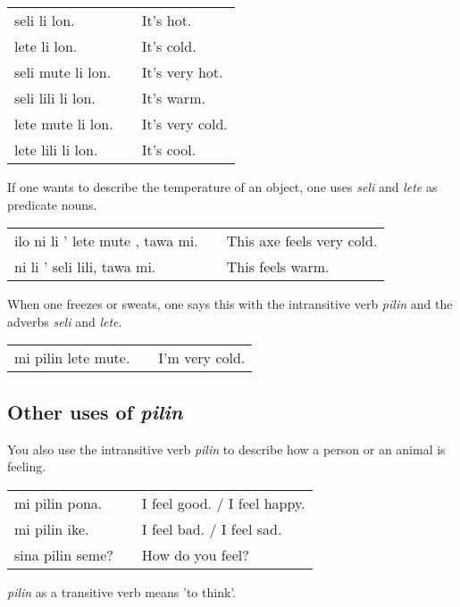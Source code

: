 {\begin{supertabular}{p{5,5cm}|ll}
seli li lon. && It's hot. \\
lete li lon. && It's cold. \\
seli mute li lon. && It's very hot. \\
seli lili li lon. && It's warm. \\
lete mute li lon. && It's very cold. \\
lete lili li lon. && It's cool. \\
\end{supertabular} 

If one wants to describe the temperature of an object, one uses \textit{seli} and \textit{lete} as predicate nouns. 

\begin{supertabular}{p{5,5cm}|ll}
ilo ni li ' lete mute , tawa mi.  && This axe feels very cold. \\
ni li ' seli lili, tawa mi. && This feels warm. \\
\end{supertabular} 

When one freezes or sweats, one says this with the intransitive verb \textit{pilin} and the adverbs \textit{seli} and \textit{lete}.

\begin{supertabular}{p{5,5cm}|ll}
mi pilin lete mute. && I'm very cold. \\
\end{supertabular}

%
\subsection*{Other uses of \textit{pilin}}
%
%
You also use the intransitive verb \textit{pilin} to describe how a person or an animal is feeling. 

\begin{supertabular}{p{5,5cm}|ll}
mi pilin pona. && I feel good. / I feel happy. \\
mi pilin ike. && I feel bad. / I feel sad. \\
sina pilin seme? && How do you feel? \\ 
\end{supertabular} 

\textit{pilin} as a transitive verb means 'to think'.

}
